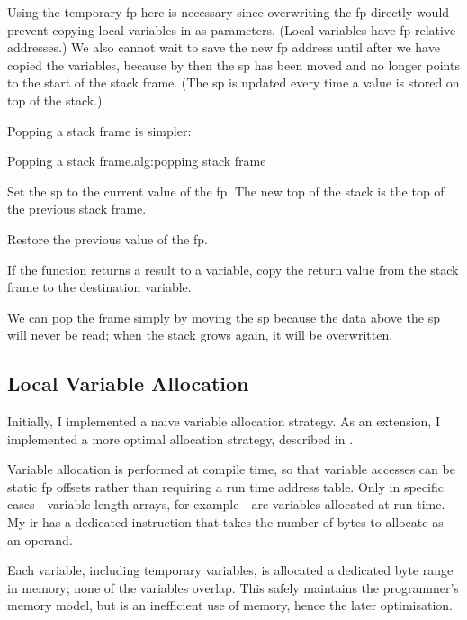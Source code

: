 \documentclass[00-main.tex]{subfiles}
\begin{document}
Using the temporary \gls{fp} here is necessary since overwriting the \gls{fp} directly would prevent copying local variables in as parameters.
(Local variables have \gls{fp}-relative addresses.)
We also cannot wait to save the new \gls{fp} address until after we have copied the variables, because by then the \gls{sp} has been moved and no longer points to the start of the stack frame.
(The \gls{sp} is updated every time a value is stored on top of the stack.)

Popping a stack frame is simpler:

\begin{Algorithm}{Popping a stack frame.}{alg:popping stack frame}
\begin{EnumerateAlgorithm}
\item
Set the \gls{sp} to the current value of the \gls{fp}.
The new top of the stack is the top of the previous stack frame.
\item
Restore the previous value of the \gls{fp}.
\item
If the function returns a result to a variable, copy the return value from the stack frame to the destination variable.
\end{EnumerateAlgorithm}
\end{Algorithm}

We can pop the frame simply by moving the \gls{sp} because the data above the \gls{sp} will never be read; when the stack grows again, it will be overwritten.

\subsection{Local Variable Allocation}\label{sec:impl:local variable allocation}

Initially, I implemented a naive variable allocation strategy.
As an extension, I implemented a more optimal allocation strategy, described in .

Variable allocation is performed at compile time, so that variable accesses can be static \gls{fp} offsets rather than requiring a run time address table.
Only in specific cases---variable-length arrays, for example---are variables allocated at run time.
My \gls{ir} has a dedicated  instruction that takes the number of bytes to allocate as an operand.

Each variable, including temporary variables, is allocated a dedicated byte range in memory; none of the variables overlap.
This safely maintains the programmer's memory model, but is an inefficient use of memory, hence the later optimisation.
\end{document}
